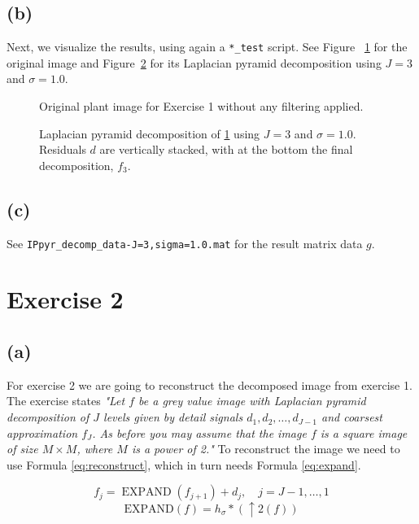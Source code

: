 \documentclass{article}
\begin{document}
\subsection*{(b)} Next, we visualize the results, using again a \texttt{*\_test} script. See Figure ~\ref{fig:plant_original} for the original image and Figure~\ref{fig:plant_all_pyr-decomp} for its Laplacian pyramid decomposition using $J=3$ and $\sigma=1.0$.

\begin{figure}[h]
    \centering
    
    \caption{Original plant image for Exercise 1 without any filtering applied.}
    \label{fig:plant_original}
\end{figure}

\begin{figure}[H]
    \centering
    
    \caption{Laplacian pyramid decomposition of \ref{fig:plant_original} using $J=3$ and $\sigma=1.0$. Residuals $d$ are vertically stacked, with at the bottom the final decomposition, $f_{3}$.}
    \label{fig:plant_all_pyr-decomp}
\end{figure}

\subsection*{(c)} See \texttt{IPpyr\_decomp\_data-J=3,sigma=1.0.mat} for the result matrix data $g$.

\newpage
\section*{Exercise 2}
\subsection*{(a)}
For exercise 2 we are going to reconstruct the decomposed image from exercise 1. The exercise states \textit{"Let $f$ be a grey value image with Laplacian pyramid decomposition of $J$ levels given by detail signals $d_1, d_2, \ldots, d_{J - 1}$ and coarsest approximation $f_J$. As before you may assume that the image $f$ is a square image of size $M \times M$, where $M$ is a power of 2."} To reconstruct the image we need to use Formula \ref{eq:reconstruct}, which in turn needs Formula \ref{eq:expand}.

\begin{equation}\label{eq:reconstruct}
    f_{j}=\operatorname{EXPAND}\left(f_{j+1}\right)+d_j, \quad j=J-1, \ldots, 1
\end{equation}
\begin{equation}\label{eq:expand}
    \mathrm{EXPAND}(f)=h_{\sigma} *(\uparrow 2(f))
\end{equation}
\end{document}
